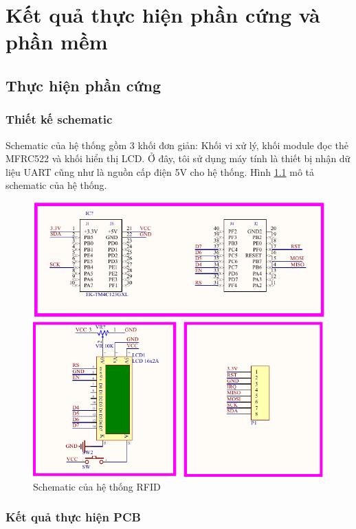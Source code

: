 \chapter{Kết quả thực hiện phần cứng và phần mềm}
\section{Thực hiện phần cứng}
\subsection{Thiết kế schematic}
Schematic của hệ thống gồm 3 khối đơn giản: Khối vi xử lý, khối module đọc thẻ MFRC522
và khối hiển thị LCD. Ở đây, tôi sử dụng máy tính là thiết bị nhận dữ liệu UART cũng như là nguồn cấp điện 5V
cho hệ thống.
Hình \ref{fig:schematic} mô tả schematic của hệ thống.
\begin{figure}[ht]
\centering
\includegraphics[scale=0.6]{images/schematic.png}
\caption{Schematic của hệ thống RFID}
\label{fig:schematic}
\end{figure}

\newpage
\subsection{Kết quả thực hiện PCB}
